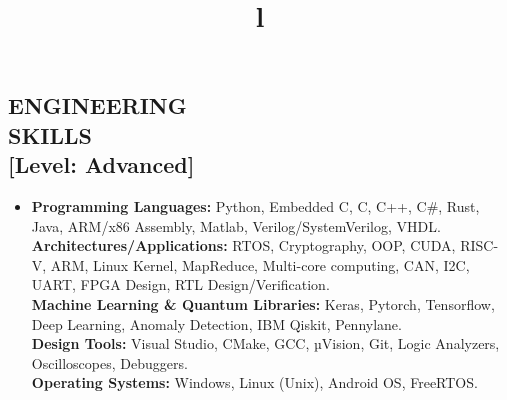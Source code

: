 \documentclass[line,margin,9pt]{res}
\begin{document}
\begin{resume}
\section{ENGINEERING\\SKILLS\\\textbf{[Level: Advanced]}}
\begin{itemize}
\item \textbf{Programming Languages:} Python, Embedded C, C, C++, C\#, Rust, Java,  ARM/x86 Assembly, Matlab, Verilog/SystemVerilog, VHDL. \\
\textbf{Architectures/Applications:} RTOS, Cryptography, OOP, CUDA, RISC-V, ARM, Linux Kernel, MapReduce, Multi-core computing, CAN, I2C, UART, FPGA Design, RTL Design/Verification. \\
\textbf{Machine Learning \& Quantum Libraries:} Keras, Pytorch, Tensorflow, Deep Learning, Anomaly Detection, IBM Qiskit, Pennylane.\\
\textbf{Design Tools:} Visual Studio, CMake, GCC, µVision, Git, Logic Analyzers, Oscilloscopes, Debuggers. \\
\textbf{Operating Systems:} Windows, Linux (Unix), Android OS, FreeRTOS.
\end{itemize}
\begin{format}
\title{l}\\
\\
\body\\
\end{format}





\end{resume}
\end{document}
